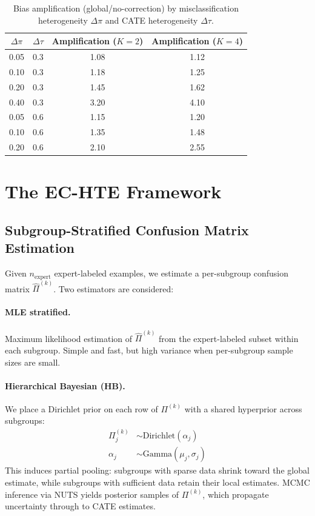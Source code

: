 \documentclass[11pt,a4paper]{article}
\begin{document}
\begin{table}[t]
\centering
\caption{Bias amplification (global/no-correction) by misclassification heterogeneity $\Delta\pi$ and CATE heterogeneity $\Delta\tau$.}
\label{tab:bias_amplification}
\begin{tabular}{@{}cccc@{}}
\toprule
$\Delta\pi$ & $\Delta\tau$ & Amplification ($K{=}2$) & Amplification ($K{=}4$) \\
\midrule
0.05 & 0.3 & 1.08 & 1.12 \\
0.10 & 0.3 & 1.18 & 1.25 \\
0.20 & 0.3 & 1.45 & 1.62 \\
0.40 & 0.3 & 3.20 & 4.10 \\
0.05 & 0.6 & 1.15 & 1.20 \\
0.10 & 0.6 & 1.35 & 1.48 \\
0.20 & 0.6 & 2.10 & 2.55 \\
\bottomrule
\end{tabular}
\end{table}


\section{The EC-HTE Framework}
\label{sec:method}

\subsection{Subgroup-Stratified Confusion Matrix Estimation}

Given $n_{\text{expert}}$ expert-labeled examples, we estimate a per-subgroup confusion matrix $\hat{\Pi}^{(k)}$. Two estimators are considered:

\paragraph{MLE stratified.} Maximum likelihood estimation of $\hat{\Pi}^{(k)}$ from the expert-labeled subset within each subgroup. Simple and fast, but high variance when per-subgroup sample sizes are small.

\paragraph{Hierarchical Bayesian (HB).} We place a Dirichlet prior on each row of $\Pi^{(k)}$ with a shared hyperprior across subgroups:
\begin{align}
\Pi^{(k)}_j &\sim \text{Dirichlet}(\alpha_j) \\
\alpha_j &\sim \text{Gamma}(\mu_j, \sigma_j)
\end{align}
This induces partial pooling: subgroups with sparse data shrink toward the global estimate, while subgroups with sufficient data retain their local estimates. MCMC inference via NUTS yields posterior samples of $\Pi^{(k)}$, which propagate uncertainty through to CATE estimates.
\end{document}
